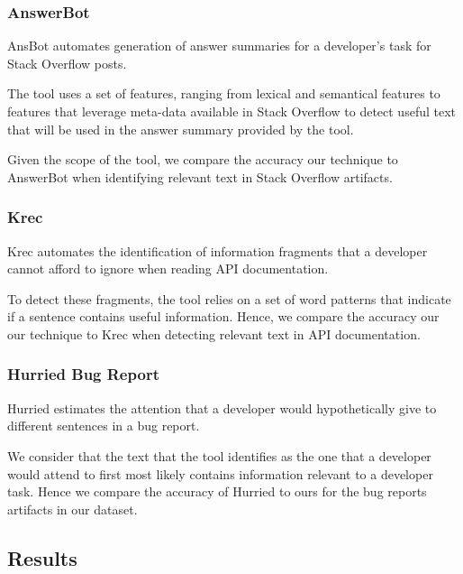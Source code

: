 \label{cp5:comparison}



\subsubsection{AnswerBot}


\acf{AnsBot} automates generation of answer summaries for a developer's task for Stack Overflow posts.

The tool uses a set of features, ranging from lexical and semantical features to features that leverage meta-data available in Stack Overflow to detect useful text that will be used in the answer summary provided by the tool. 

Given the scope of the tool, we compare the accuracy our technique to AnswerBot when identifying relevant text in 
Stack Overflow artifacts.


\subsubsection{Krec}


\acf{Krec} automates the identification of information fragments that a developer cannot afford to ignore when reading API documentation.

To detect these fragments, the tool relies on a set of word patterns that indicate if a sentence contains useful information. Hence, we compare the accuracy our our technique to Krec when detecting relevant text in API documentation.


\subsubsection{Hurried Bug Report}


\acf{Hurried} estimates the attention that a developer would hypothetically give to different sentences in a bug report. 


We consider that the text that the tool identifies as the one that a developer would attend to first most likely contains information relevant to a developer task. Hence we compare the accuracy of \acf{Hurried} to ours for the bug reports artifacts in our dataset.


\subsection{Results}




% 


% 


% 



